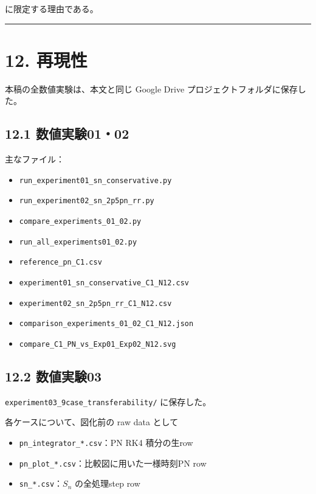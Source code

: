 \documentclass[
  a4paper,
]{ltjsarticle}
\providecommand{\tightlist}{%
  \setlength{\itemsep}{0pt}\setlength{\parskip}{0pt}}
\begin{document}
に限定する理由である。

\begin{center}\rule{0.5\linewidth}{0.5pt}\end{center}

\section{12. 再現性}\label{ux518dux73feux6027}

本稿の全数値実験は、本文と同じ Google Drive
プロジェクトフォルダに保存した。

\subsection{12.1 数値実験01・02}\label{ux6570ux5024ux5b9fux9a130102}

主なファイル：

\begin{itemize}
\tightlist
\item
  \texttt{run\_experiment01\_sn\_conservative.py}
\item
  \texttt{run\_experiment02\_sn\_2p5pn\_rr.py}
\item
  \texttt{compare\_experiments\_01\_02.py}
\item
  \texttt{run\_all\_experiments01\_02.py}
\item
  \texttt{reference\_pn\_C1.csv}
\item
  \texttt{experiment01\_sn\_conservative\_C1\_N12.csv}
\item
  \texttt{experiment02\_sn\_2p5pn\_rr\_C1\_N12.csv}
\item
  \texttt{comparison\_experiments\_01\_02\_C1\_N12.json}
\item
  \texttt{compare\_C1\_PN\_vs\_Exp01\_Exp02\_N12.svg}
\end{itemize}

\subsection{12.2 数値実験03}\label{ux6570ux5024ux5b9fux9a1303}

\texttt{experiment03\_9case\_transferability/} に保存した。

各ケースについて、図化前の raw data として

\begin{itemize}
\tightlist
\item
  \texttt{pn\_integrator\_*.csv}：PN RK4 積分の生row
\item
  \texttt{pn\_plot\_*.csv}：比較図に用いた一様時刻PN row
\item
  \texttt{sn\_*.csv}：\(S_n\) の全処理step row
\end{itemize}
\end{document}
